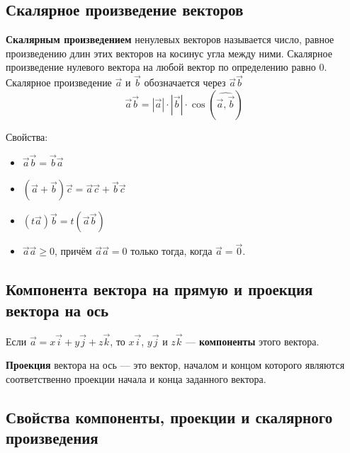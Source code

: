 \documentclass[a4paper]{article}
\begin{document}
    \newpage \begin{center}
                 \begin{Large}
                 \end{Large}
    \end{center}
    \subsection*{Скалярное произведение векторов}

    \textbf{Скалярным произведением} ненулевых векторов называется число, равное
    произведению длин этих векторов на косинус угла между ними. Скалярное
    произведение нулевого вектора на любой вектор по определению равно 0.
    Скалярное произведение $\vec{a}$ и $\vec{b}$ обозначается через $\vec{a} \vec{b}$
    \begin{equation}
        \vec{a} \vec{b} = |\vec{a}| \cdot | \vec{b} | \cdot \cos(\widehat{\vec{a}, \vec{b}})
    \end{equation}

    Свойства:
    \begin{itemize}
        \item $\vec{a} \vec{b} = \vec{b} \vec{a}$
        \item $(\vec{a} + \vec{b}) \vec{c} = \vec{a} \vec{c} + \vec{b} \vec{c}$
        \item $(t \vec{a}) \vec{b} = t (\vec{a} \vec{b})$
        \item $\vec{a} \vec{a} \geq 0$, причём $\vec{a} \vec{a} = 0$ только тогда, когда $\vec{a} = \vec{0}$.
    \end{itemize}

    \subsection*{Компонента вектора на прямую и проекция вектора на ось
    }
    Если $\vec{a} = x \vec{i} + y \vec{j} + z \vec{k}$, то $x \vec{i}$, $y \vec{j}$ и $z \vec{k}$ --- \textbf{компоненты} этого вектора.

    \textbf{Проекция} вектора на ось --– это вектор, началом и концом которого являются соответственно проекции начала и конца заданного вектора.

    \subsection*{Свойства компоненты, проекции и скалярного произведения}
\end{document}
